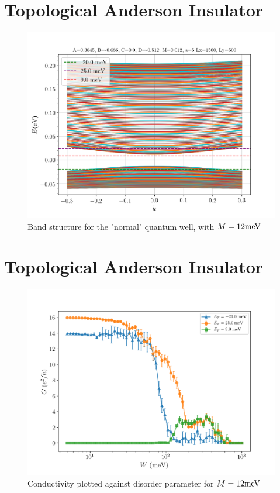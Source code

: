 \documentclass[12pt]{article}
\numberwithin{equation}{section}
\begin{document}
\newpage
\section*{Topological Anderson Insulator}
\begin{figure}[h!]
    \begin{center}
        \includegraphics[height=0.75\textheight]{./media/bstructure_params_Lx=1500_Ly=500_M=0_012.png}
    \end{center}
    \caption{Band structure for the "normal" quantum well, with $M=12\textnormal{meV}$}
\end{figure}


\newpage
\section*{Topological Anderson Insulator}
\begin{figure}[h!]
    \begin{center}
        \includegraphics[height=0.75\textheight]{./media/tai_results_params1_nsamples=4.png}
    \end{center}
    \caption{Conductivity plotted against disorder parameter for $M=12\textnormal{meV}$}
\end{figure}
\end{document}
